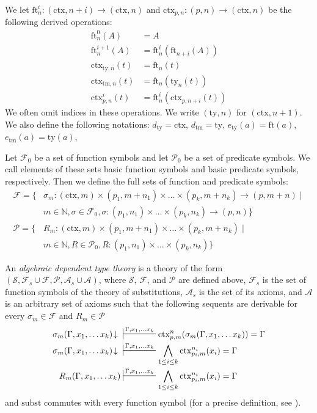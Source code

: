\documentclass[reqno]{amsart}
\theoremstyle{definition}
\theoremstyle{remark}
\newcommand{\fs}[1]{\mathrm{#1}}
\newcommand{\subst}{\fs{subst}}
\newcommand{\ft}{\fs{ft}}
\newcommand{\ty}{\fs{ty}}
\newcommand{\ctx}{\fs{ctx}}
\newcommand{\tm}{\fs{tm}}
\numberwithin{figure}{section}
\begin{document}
We let $\ft^i_n : (\ctx,n+i) \to (\ctx,n)$ and $\ctx_{p,n} : (p,n) \to (\ctx,n)$ be the following derived operations:
\begin{align*}
\ft^0_n(A)      & = A \\
\ft^{i+1}_n(A)  & = \ft^i_n(\ft_{n+i}(A)) \\
\ctx_{\ty,n}(t) & = \ft_n(t) \\
\ctx_{\tm,n}(t) & = \ft_n(\ty_n(t)) \\
\ctx^i_{p,n}(t) & = \ft^i_n(\ctx_{p,n+i}(t))
\end{align*}
We often omit indices in these operations.
We write $(\ty,n)$ for $(\ctx,n+1)$.
We also define the following notations: $d_\ty = \ctx$, $d_\tm = \ty$, $e_\ty(a) = \ft(a)$, $e_\tm(a) = \ty(a)$,

Let $\mathcal{F}_0$ be a set of function symbols and let $\mathcal{P}_0$ be a set of predicate symbols.
We call elements of these sets basic function symbols and basic predicate symbols, respectively.
Then we define the full sets of function and predicate symbols:
\begin{align*}
\mathcal{F} = \{ & \sigma_m : (\ctx,m) \times (p_1,m+n_1) \times \ldots \times (p_k,m+n_k) \to (p,m+n) \mid \\
                 & m \in \mathbb{N}, \sigma \in \mathcal{F}_0, \sigma : (p_1,n_1) \times \ldots \times (p_k,n_k) \to (p,n) \} \\
\mathcal{P} = \{ & R_m : (\ctx,m) \times (p_1,m+n_1) \times \ldots \times (p_k,m+n_k) \mid \\
                 & m \in \mathbb{N}, R \in \mathcal{P}_0, R : (p_1,n_1) \times \ldots \times (p_k,n_k) \}
\end{align*}

\begin{defn}[alg-tt]
An \emph{algebraic dependent type theory} is a theory of the form $(\mathcal{S}, \mathcal{F}_s \cup \mathcal{F}, \mathcal{P}, \mathcal{A}_s \cup \mathcal{A})$, where $\mathcal{S}$, $\mathcal{F}$, and $\mathcal{P}$ are defined above,
$\mathcal{F}_s$ is the set of function symbols of the theory of substitutions, $\mathcal{A}_s$ is the set of its axioms, and $\mathcal{A}$ is an arbitrary set of axioms such that the following sequents are derivable for every $\sigma_m \in \mathcal{F}$ and $R_m \in \mathcal{P}$
\begin{align*}
\sigma_m(\Gamma, x_1, \ldots x_k)\!\downarrow\ & \sststile{}{\Gamma, x_1, \ldots x_k} \ctx^n_{p,m}(\sigma_m(\Gamma, x_1, \ldots x_k)) = \Gamma \\
\sigma_m(\Gamma, x_1, \ldots x_k)\!\downarrow\ & \sststile{}{\Gamma, x_1, \ldots x_k} \bigwedge_{1 \leq i \leq k} \ctx^{n_i}_{p_i,m}(x_i) = \Gamma \\
R_m(\Gamma, x_1, \ldots x_k) & \sststile{}{\Gamma, x_1, \ldots x_k} \bigwedge_{1 \leq i \leq k} \ctx^{n_i}_{p_i,m}(x_i) = \Gamma
\end{align*}
and $\subst$ commutes with every function symbol (for a precise definition, see \cite[Definition~4.5]{alg-tt}).
\end{defn}
\end{document}
